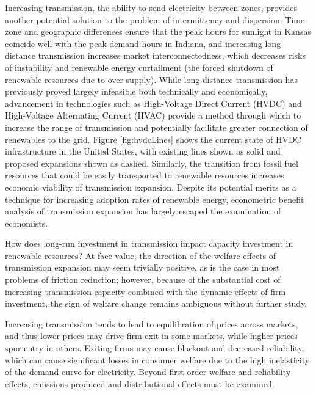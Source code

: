 \documentclass[12pt]{article}
\begin{document}
Increasing transmission, the ability to send electricity between zones, provides another potential solution to the problem of intermittency and dispersion. Time-zone and geographic differences ensure that the peak hours for sunlight in Kansas coincide well with the peak demand hours in Indiana, and increasing long-distance transmission increases market interconnectedness, which decreases risks of instability and renewable energy curtailment (the forced shutdown of renewable resources due to over-supply). While long-distance transmission has previously proved largely infeasible both technically and economically, advancement in technologies such as High-Voltage Direct Current (HVDC) and High-Voltage Alternating Current (HVAC) provide a method through which to increase the range of transmission and potentially facilitate greater connection of renewables to the grid. Figure \ref{fig:hvdcLines} shows the current state of HVDC infrastructure in the United States, with existing lines shown as solid and proposed expansions shown as dashed. Similarly, the transition from fossil fuel resources that could be easily transported to renewable resources increases economic viability of transmission expansion. Despite its potential merits as a technique for increasing adoption rates of renewable energy, econometric benefit analysis of transmission expansion has largely escaped the examination of economists.

How does long-run investment in transmission impact capacity investment in renewable resources? At face value, the direction of the welfare effects of transmission expansion may seem trivially positive, as is the case in most problems of friction reduction; however, because of the substantial cost of increasing transmission capacity combined with the dynamic effects of firm investment, the sign of welfare change remains ambiguous without further study.

Increasing transmission tends to lead to equilibration of prices across markets, and thus lower prices may drive firm exit in some markets, while higher prices spur entry in others. Exiting firms may cause blackout and decreased reliability, which can cause significant losses in consumer welfare due to the high inelasticity of the demand curve for electricity. Beyond first order welfare and reliability effects, emissions produced and distributional effects must be examined. 
\end{document}

